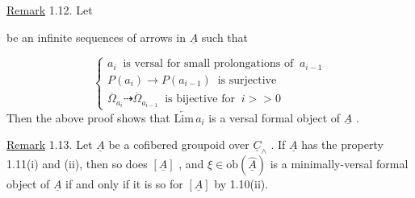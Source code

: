 \underline{Remark} 1.12.  Let
be an infinite sequences of arrows in  $\underline{A}$  such that

\begin{equation*}
\left\{\begin{array}{l}
a_i \ \text{ is versal for small prolongations of } \ a_{i-1} \\[2pt]
P(a_i) \longrightarrow P(a_{i-1}) \ \text{ is surjective} \\[2pt]
\overline{\Omega}_{a_i} \dashrightarrow \overline{\Omega}_{a_{i-1}} \ \text{ is bijective for } \ i >> 0
\end{array}\right.
\end{equation*}
Then the above proof shows that  $\underleftarrow{\mathrm{Lim}}\, a_i$  is a versal formal object of  $\underline{A}$  .

\underline{Remark} 1.13.  Let  $\underline{A}$  be a cofibered groupoid over  $\underline{C}_\wedge$  . If  $\underline{A}$  has the property 1.11(i) and (ii), then so does  $[\underline{A}]$  , and  $\xi \in \mathrm{ob}(\hat{\underline{A}})$  is a minimally-versal formal object of  $\underline{A}$  if and only if it is so for  $[\underline{A}]$  by 1.10(ii).

